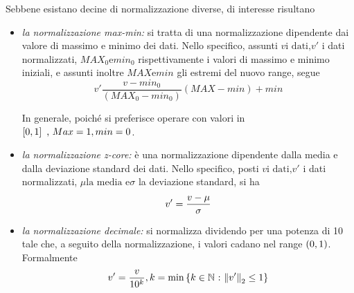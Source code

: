 \documentclass{subfiles}
\begin{document}
Sebbene esistano decine di normalizzazione diverse, di interesse risultano
\begin{itemize}
    \item \emph{la normalizzazione max-min:} si tratta di una normalizzazione dipendente dai valore di massimo e minimo dei dati.
          Nello specifico, assunti $v \text{i dati,} v' $ i dati normalizzati, $MAX_{0} \text{e} min_{0}$ rispettivamente i valori di massimo e minimo iniziali,
          e assunti inoltre $MAX \text{e} min$ gli estremi del nuovo range, segue
          $$
              v'  \frac{v - min_{0}}{(MAX_{0} - min_{0})}(MAX - min) + min
          $$
          \begin{MarginNote}
              In generale, poiché si preferisce operare con valori in \(\Range*{0}{1} \text{,} Max = 1, min = 0\).
          \end{MarginNote}

    \item \emph{la normalizzazione z-core:} è una normalizzazione dipendente dalla media e dalla deviazione standard dei dati.
          Nello specifico, posti $v \text{i dati,} v'$ i dati normalizzati, $\mu \text{la media e} \sigma$ la deviazione standard, si ha
          $$
              v' = \Frac{v - \mu}{\sigma}
          $$

    \item \emph{la normalizzazione decimale:} si normalizza dividendo per una potenza di 10 tale che,
          a seguito della normalizzazione, i valori cadano nel range $\Range{0}{1}$.
          Formalmente
          $$
              v' = \Frac{v}{10^{k}}, k = \Min{k \in \Natural}[\Norm{v'} \le 1]
          $$
\end{itemize}
\end{document}
